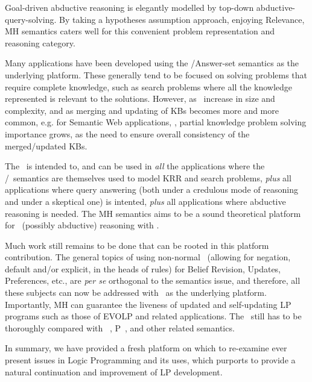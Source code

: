 \documentclass{llncs}
\begin{document}
		Goal-driven abductive reasoning is elegantly modelled by top-down abductive-query-solving. 
		By taking a hypotheses assumption approach, enjoying Relevance, MH semantics caters well for this convenient problem representation and
		reasoning category.
	
		Many applications have been developed using the \SM/Answer-set semantics as the underlying platform.
		These generally tend to be focused on solving problems that require complete knowledge, such as search problems where all the knowledge
		represented is relevant to the solutions.
		However, as \KBs\ increase in size and complexity, and as merging and updating of KBs becomes more and more common, e.g. for
		Semantic Web applications, \cite{MKNFpadl10},
		partial knowledge problem solving importance grows, as the need to ensure overall
		consistency of the merged/updated KBs.
		
		The \MHs\ is intended to, and can be used in
		\emph{all} the applications where the \SMs/\ASs\ semantics are themselves used to model KRR and search problems,
		\emph{plus} all applications where query answering (both under a credulous mode of reasoning and under a skeptical one) is intented, 
		\emph{plus} all applications where abductive reasoning is needed.
		The MH semantics aims to be a sound theoretical platform for \twov\ (possibly abductive) reasoning with \lps.
	
		Much work still remains to be done that can be rooted in this platform contribution.
		The general topics of using non-normal \lps\ (allowing for negation, default and/or explicit, in the heads of rules) for Belief Revision, Updates, Preferences, etc., are \emph{per se} orthogonal to the semantics issue, and therefore, all these subjects can now be addressed with \MHs\ as the
		underlying platform.
Importantly, MH can guarantee the liveness of updated and self-updating LP programs such as those of EVOLP \cite{EVOLP} and related
		applications.
The \MHs\ still has to be thoroughly compared with \RSMs\ \cite{PP05}, P\SMs\ \cite{DBLP:conf/micai/OsorioN07}, and other related
		semantics.
								
		In summary, we have provided a fresh platform on which to re-examine ever present issues in Logic Programming and its uses, which
		purports to provide a natural continuation and improvement of LP development.

	
	
	
\end{document}
